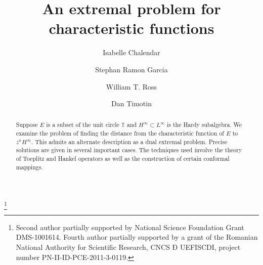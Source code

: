 \documentclass[11pt,reqno]{amsart}
\numberwithin{equation}{section}
\theoremstyle{plain}
\theoremstyle{definition}
\begin{document}


    \title{An extremal problem for characteristic functions}

\author[I.~Chalendar]{Isabelle Chalendar}
\address{Institut Camille Jordan, University of Lyon I, 43 Boulevard du 11 Bovembre 1918,
69622 Villeurbanne cedex,
France}

    \author[S.R.~Garcia]{Stephan Ramon Garcia}
     \address{   Department of Mathematics\\
            Pomona College\\
            Claremont, California\\
            91711 \\ USA}
  

    \author[W.T.~Ross]{William T. Ross}
    \address{Department of Mathematics and Computer Science\\
            University of Richmond\\
            Richmond, Virginia\\
            23173 \\ USA}

	\author[D.~Timotin]{Dan Timotin}
	\address{Simion Stoilow Institute of Mathematics of the Romanian Academy, PO Box 1-764, Bucharest 014700, Romania}


    \thanks{Second author partially supported by National Science Foundation Grant DMS-1001614. Fourth author partially supported by a grant of the Romanian National Authority for Scientific
Research, CNCS Ð UEFISCDI, project number PN-II-ID-PCE-2011-3-0119.}

\begin{abstract}
	Suppose $E$ is a subset of the unit circle ${\mathbb{T}}$ and $H^\infty\subset L^\infty$ is the Hardy subalgebra. We examine the problem of finding the distance from the characteristic function of $E$ to $z^nH^\infty$. This admits an alternate description as a dual extremal problem. Precise solutions are given in several important cases. The techniques used involve the theory of Toeplitz and Hankel operators as well as the construction of certain conformal mappings.
\end{abstract}
\end{document}
